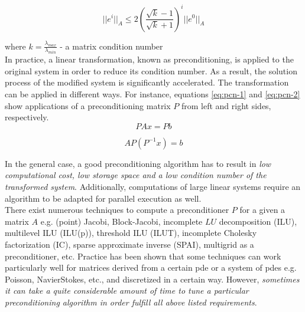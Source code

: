 \begin{equation} \label{eq:Gmres-7}
	|| e^i ||_A \leq 2 ( \frac{\sqrt k - 1}{\sqrt k + 1} )^i || e^0 ||_A
\end{equation}

where $k = \frac{\lambda_{max}}{\lambda_{min}}$ - a matrix condition number\\


In practice, a linear transformation, known as preconditioning, is applied to the original system in order to reduce its condition number. As a result, the solution process of the modified system is significantly accelerated. The transformation can be applied in different ways. For instance, equations \ref{eq:pcn-1} and \ref{eq:pcn-2} show applications of a preconditioning matrix $P$ from left and right sides, respectively.\\


\begin{equation} \label{eq:pcn-1}
	PAx = Pb
\end{equation}


\begin{equation} \label{eq:pcn-2}
	AP(P^{-1}x) = b
\end{equation}


In the general case, a good preconditioning algorithm has to result in \textit{low computational cost, low storage space and a low condition number of the transformed system}. Additionally, computations of large linear systems require an algorithm to be adapted for parallel execution as well.\\


There exist numerous techniques to compute a preconditioner $P$ for a given a matrix $A$ e.g. (point) Jacobi, Block-Jacobi, incomplete $LU$ decomposition (ILU), multilevel ILU (ILU(p)), threshold ILU (ILUT), incomplete Cholesky factorization (IC), sparse approximate inverse (SPAI), multigrid as a preconditioner, etc. Practice has been shown that some techniques can work particularly well for matrices derived from a certain \acrshort{pde} or a system of \acrshort{pde}s e.g. Poisson, Navier\-Stokes, etc., and discretized in a certain way. However, \textit{sometimes it can take a quite considerable amount of time to tune a particular preconditioning algorithm in order fulfill all above listed requirements}.\\


